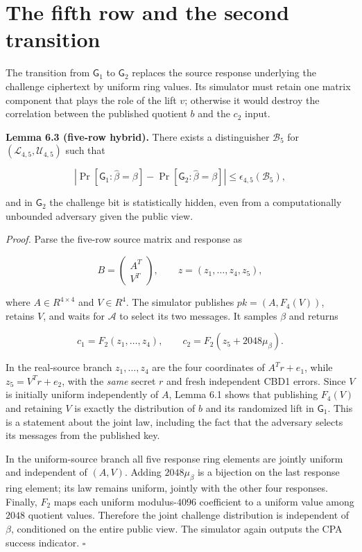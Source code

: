 \documentclass[
  11pt,
  a4paper,
  oneside]{report}
\begin{document}
\section{The fifth row and the second
transition}\label{the-fifth-row-and-the-second-transition}

The transition from \(\mathsf G_1\) to \(\mathsf G_2\) replaces the
source response underlying the challenge ciphertext by uniform ring
values. Its simulator must retain one matrix component that plays the
role of the lift \(v\); otherwise it would destroy the correlation
between the published quotient \(b\) and the \(c_2\) input.

\textbf{Lemma 6.3 (five-row hybrid).} There exists a distinguisher
\(\mathcal B_5\) for \((\mathcal L_{4,5},\mathcal U_{4,5})\) such that

\[
\left|\Pr[\mathsf G_1:\widehat\beta=\beta]
-\Pr[\mathsf G_2:\widehat\beta=\beta]\right|
\le\epsilon_{4,5}(\mathcal B_5),
\]

and in \(\mathsf G_2\) the challenge bit is statistically hidden, even
from a computationally unbounded adversary given the public view.

\emph{Proof.} Parse the five-row source matrix and response as

\[
B=\begin{pmatrix}A^T\\ V^T\end{pmatrix},
\qquad z=(z_1,\ldots,z_4,z_5),
\]

where \(A\in R^{4\times4}\) and \(V\in R^4\). The simulator publishes
\(pk=(A,F_4(V))\), retains \(V\), and waits for \(\mathcal A\) to select
its two messages. It samples \(\beta\) and returns

\[
c_1=F_2(z_1,\ldots,z_4),\qquad
c_2=F_2(z_5+2048\mu_\beta).
\]

In the real-source branch \(z_1,\ldots,z_4\) are the four coordinates of
\(A^Tr+e_1\), while \(z_5=V^Tr+e_2\), with the \emph{same} secret \(r\)
and fresh independent CBD1 errors. Since \(V\) is initially uniform
independently of \(A\), Lemma 6.1 shows that publishing \(F_4(V)\) and
retaining \(V\) is exactly the distribution of \(b\) and its randomized
lift in \(\mathsf G_1\). This is a statement about the joint law,
including the fact that the adversary selects its messages from the
published key.

In the uniform-source branch all five response ring elements are jointly
uniform and independent of \((A,V)\). Adding \(2048\mu_\beta\) is a
bijection on the last response ring element; its law remains uniform,
jointly with the other four responses. Finally, \(F_2\) maps each
uniform modulus-\(4096\) coefficient to a uniform value among \(2048\)
quotient values. Therefore the joint challenge distribution is
independent of \(\beta\), conditioned on the entire public view. The
simulator again outputs the CPA success indicator. \(\square\)
\end{document}
